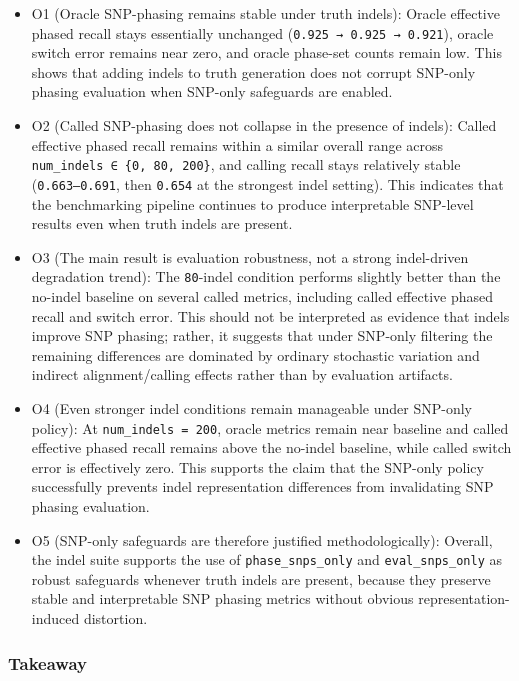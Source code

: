 \documentclass[
]{article}
\begin{document}
\begin{itemize}
\item
  O1 (Oracle SNP-phasing remains stable under truth indels): Oracle
  effective phased recall stays essentially unchanged
  (\texttt{0.925\ →\ 0.925\ →\ 0.921}), oracle switch error remains near
  zero, and oracle phase-set counts remain low. This shows that adding
  indels to truth generation does not corrupt SNP-only phasing
  evaluation when SNP-only safeguards are enabled.
\item
  O2 (Called SNP-phasing does not collapse in the presence of indels):
  Called effective phased recall remains within a similar overall range
  across \texttt{num\_indels\ ∈\ \{0,\ 80,\ 200\}}, and calling recall
  stays relatively stable (\texttt{0.663–0.691}, then \texttt{0.654} at
  the strongest indel setting). This indicates that the benchmarking
  pipeline continues to produce interpretable SNP-level results even
  when truth indels are present.
\item
  O3 (The main result is evaluation robustness, not a strong
  indel-driven degradation trend): The \texttt{80}-indel condition
  performs slightly better than the no-indel baseline on several called
  metrics, including called effective phased recall and switch error.
  This should not be interpreted as evidence that indels improve SNP
  phasing; rather, it suggests that under SNP-only filtering the
  remaining differences are dominated by ordinary stochastic variation
  and indirect alignment/calling effects rather than by evaluation
  artifacts.
\item
  O4 (Even stronger indel conditions remain manageable under SNP-only
  policy): At \texttt{num\_indels\ =\ 200}, oracle metrics remain near
  baseline and called effective phased recall remains above the no-indel
  baseline, while called switch error is effectively zero. This supports
  the claim that the SNP-only policy successfully prevents indel
  representation differences from invalidating SNP phasing evaluation.
\item
  O5 (SNP-only safeguards are therefore justified methodologically):
  Overall, the indel suite supports the use of
  \texttt{phase\_snps\_only} and \texttt{eval\_snps\_only} as robust
  safeguards whenever truth indels are present, because they preserve
  stable and interpretable SNP phasing metrics without obvious
  representation-induced distortion.
\end{itemize}

\subsubsection{Takeaway}\label{takeaway-5}
\end{document}
